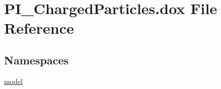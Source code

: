 \hypertarget{_p_i___charged_particles_8dox}{}\section{P\+I\+\_\+\+Charged\+Particles.\+dox File Reference}
\label{_p_i___charged_particles_8dox}
\subsection*{Namespaces}
\begin{DoxyCompactItemize}
\item 
 \hyperlink{namespacemodel}{model}
\end{DoxyCompactItemize}
